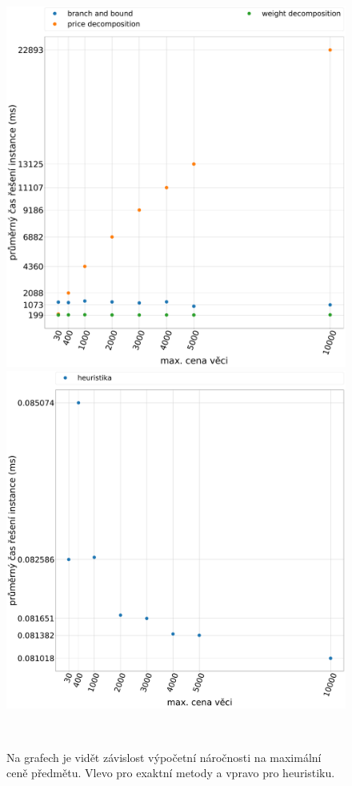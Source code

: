 \documentclass[11pt]{article}
\begin{document}
\begin{figure}
	\centering
    \begin{minipage}[c]{0.49\textwidth}
        \centering\includegraphics[width=\textwidth]{img/CE.pdf} 
    \end{minipage}
    \begin{minipage}[c]{0.49\textwidth}
        \centering \includegraphics[width=\textwidth]{img/CH.pdf} 
    \end{minipage}
    \\
   \caption{Na grafech je vidět závislost výpočetní náročnosti na maximální ceně předmětu. Vlevo pro exaktní metody a vpravo pro heuristiku.}\label{fig:WI}
    \end{figure} 
\end{document}
